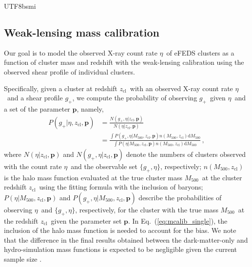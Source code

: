 \documentclass[longauth]{aa}
\newcommand{\Mfiveoo}{\ensuremath{M_{500}}}
\newcommand{\dif}{\ensuremath{\mathrm{d}}}
\newcommand{\zcl}{\ensuremath{z_{\mathrm{cl}}}}
\newcommand{\gshear}{\ensuremath{g_{+}}}
\newcommand{\rate}{\ensuremath{\eta}}
\begin{document}
\begin{CJK*}{UTF8}{bsmi}
\subsection{Weak-lensing mass calibration}
\label{sec:wlmcalib}

Our goal is to model the observed X-ray count rate \rate\ of eFEDS clusters as a function of cluster mass and redshift with the weak-lensing calibration using the observed shear profile of individual clusters.

Specifically, given a cluster at redshift \zcl\ with an observed X-ray count rate \rate\ and a shear profile \gshear, we compute the probability of observing \gshear\ given \rate\ and a set of the parameter $\mathbf{p}$, namely,
%
\begin{align}
\label{eq:mcalib_single}
P\left(\gshear|\rate,\zcl,\mathbf{p}\right) &=
\frac{
N\left(\gshear, \rate|\zcl,\mathbf{p}\right)
}{
N\left(\rate|\zcl,\mathbf{p}\right)
} \nonumber \\
& =
\frac{
\int
P\left(\gshear,\rate|\Mfiveoo,\zcl,\mathbf{p}\right)
n\left(\Mfiveoo,\zcl\right)\dif\Mfiveoo
}{
\int
P\left(\rate|\Mfiveoo,\zcl,\mathbf{p}\right)
n\left(\Mfiveoo,\zcl\right)\dif\Mfiveoo
}
\, ,
\end{align}
%
where $N\left(\rate|\zcl,\mathbf{p}\right)$ and $N\left(\gshear, \rate|\zcl,\mathbf{p}\right)$ denote the numbers of clusters observed with the count rate \rate\ and the observable set $\{ \gshear, \rate\}$, respectively; 
$n\left(\Mfiveoo,\zcl\right)$ is the halo mass function evaluated at the true cluster mass \Mfiveoo\ at the cluster redshift \zcl\ using the \cite{bocquet16} fitting formula with the inclusion of baryons;
$P\left(\rate|\Mfiveoo,\zcl,\mathbf{p}\right)$ and 
$P\left(\gshear,\rate|\Mfiveoo,\zcl,\mathbf{p}\right)$ describe the probabilities of observing \rate\ and $\{ \gshear, \rate\}$, respectively, for the cluster with the true mass \Mfiveoo\ at the redshift \zcl\ given the parameter set $\mathbf{p}$.
In Eq.~(\ref{eq:mcalib_single}), the inclusion of the halo mass function is needed to account for the \citet{eddington13} bias.
We note that the difference in the final results obtained between the dark-matter-only and hydro-simulation mass functions is expected to be negligible given the current sample size \citep{bocquet16,castro21}.



\end{CJK*}
\end{document}
